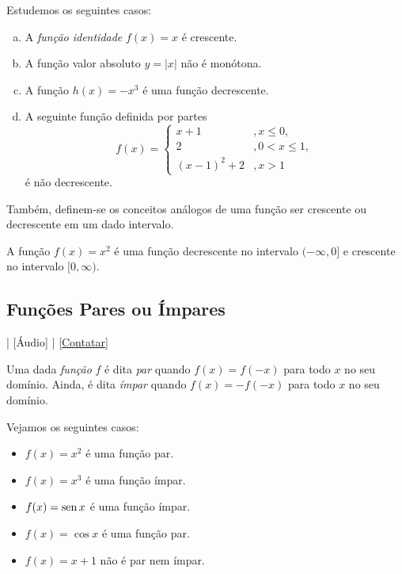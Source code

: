 \begin{ex}
  Estudemos os seguintes casos:
  \begin{enumerate}[a)]
  \item A \emph{função identidade} $f(x)=x$ é crescente.
  \item A função valor absoluto $y=|x|$ não é monótona.
  \item A função $h(x)=-x^3$ é uma função decrescente. 
  \item A seguinte função definida por partes
    \begin{equation}
      f(x) = \left\{
        \begin{array}{ll}
          x+1 &,x\leq 0,\\
          2 &,0<x\leq 1,\\
          (x-1)^2+2 &, x>1
        \end{array}
      \right.
    \end{equation}
    é não decrescente.
  \end{enumerate}
\end{ex}

Também, definem-se os conceitos análogos de uma função ser crescente ou decrescente em um dado intervalo.

\begin{ex}
  A função $f(x) = x^2$ é uma função decrescente no intervalo $(-\infty, 0]$ e crescente no intervalo $[0, \infty)$.
\end{ex}

\subsection{Funções Pares ou Ímpares}

\begin{flushright}
  [Vídeo] | [Áudio] | \href{https://phkonzen.github.io/notas/contato.html}{[Contatar]}
\end{flushright}

Uma dada \emph{função} $f$ é dita \emph{par} quando $f(x)=f(-x)$ para todo $x$ no seu domínio. Ainda, é dita \emph{ímpar} quando $f(x)=-f(-x)$ para todo $x$ no seu domínio.

\begin{ex}
  Vejamos os seguintes casos:
  \begin{itemize}
  \item $f(x) = x^2$ é uma função par.
  \item $f(x) = x^3$ é uma função ímpar.
  \item $f(x) = \operatorname{sen} x$ é uma função ímpar.
  \item $f(x) = \cos x$ é uma função par.
  \item $f(x) = x+1$ não é par nem ímpar.
  \end{itemize}
\end{ex}

